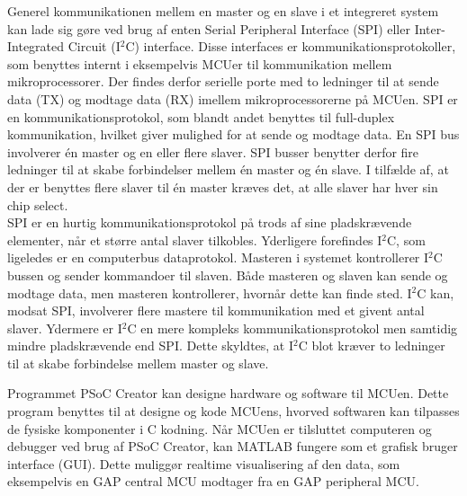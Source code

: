 Generel kommunikationen mellem en master og en slave i et integreret system kan lade sig gøre ved brug af enten Serial Peripheral Interface (SPI) eller Inter-Integrated Circuit (I$^{2}$C) interface. Disse interfaces er kommunikationsprotokoller, som benyttes internt i eksempelvis MCUer til kommunikation mellem mikroprocessorer. Der findes derfor serielle porte med to ledninger til at sende data (TX) og modtage data (RX) imellem mikroprocessorerne på MCUen. \citep{Semiconductor2016} \newline
SPI er en kommunikationsprotokol, som blandt andet benyttes til full-duplex kommunikation, hvilket giver mulighed for at sende og modtage data. En SPI bus involverer én master og en eller flere slaver. SPI busser benytter derfor fire ledninger til at skabe forbindelser mellem én master og én slave. I tilfælde af, at der er benyttes flere slaver til én master kræves det, at alle slaver har hver sin chip select. \\SPI er en hurtig kommunikationsprotokol på trods af sine pladskrævende elementer, når et større antal slaver tilkobles. \citep{Semiconductor2016,Sparkfun2016} \newline
Yderligere forefindes I$^{2}$C, som ligeledes er en computerbus dataprotokol. Masteren i systemet kontrollerer I$^{2}$C bussen og sender kommandoer til slaven. Både masteren og slaven kan sende og modtage data, men masteren kontrollerer, hvornår dette kan finde sted. I$^{2}$C kan, modsat SPI, involverer flere mastere til kommunikation med et givent antal slaver. Ydermere er I$^{2}$C en mere kompleks kommunikationsprotokol men samtidig mindre pladskrævende end SPI. Dette skyldtes, at I$^{2}$C blot kræver to ledninger til at skabe forbindelse mellem master og slave. \citep{Semiconductor2016,Sparkfun2016} %

Programmet PSoC Creator kan designe hardware og software til MCUen. Dette program benyttes til at designe og kode MCUens, hvorved softwaren kan tilpasses de fysiske komponenter i C kodning. \citep{Semiconductor2016} Når MCUen er tilsluttet computeren og debugger ved brug af PSoC Creator, kan MATLAB fungere som et grafisk bruger interface (GUI). Dette muliggør realtime visualisering af den data, som eksempelvis en GAP central MCU modtager fra en GAP peripheral MCU.\citep{Semiconductor2016,Sparkfun2016}

